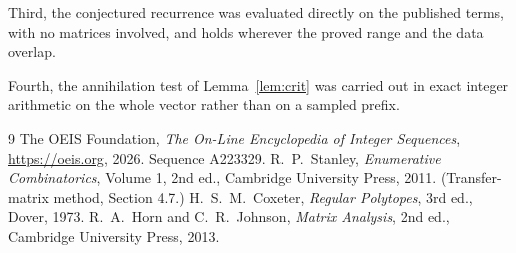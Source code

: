 \documentclass[11pt,a4paper]{article}
\theoremstyle{plain}
\theoremstyle{definition}
\begin{document}
Third, the conjectured recurrence was evaluated directly on the published terms, with no
matrices involved, and holds wherever the proved range and the data overlap.

Fourth, the annihilation test of Lemma~\ref{lem:crit} was carried out in exact integer
arithmetic on the whole vector rather than on a sampled prefix.

\begin{thebibliography}{9}
 The OEIS Foundation, \emph{The On-Line Encyclopedia of Integer
Sequences}, \url{https://oeis.org}, 2026. Sequence A223329.
 R.~P.~Stanley, \emph{Enumerative Combinatorics}, Volume 1, 2nd ed.,
Cambridge University Press, 2011. (Transfer-matrix method, Section 4.7.)
 H.~S.~M.~Coxeter, \emph{Regular Polytopes}, 3rd ed., Dover, 1973.
 R.~A.~Horn and C.~R.~Johnson, \emph{Matrix Analysis}, 2nd ed., Cambridge
University Press, 2013.
\end{thebibliography}
\end{document}

